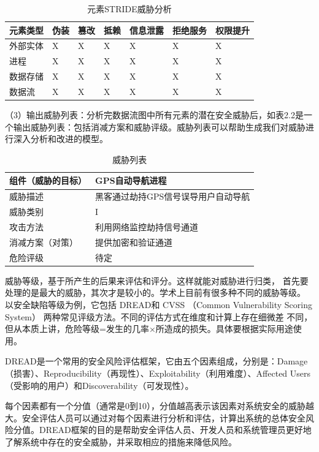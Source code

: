   \begin{table}
    \caption{元素STRIDE威胁分析}
  \begin{center}
    \begin{tabular}{|l|l|l|l|l|l|l}
      \hline 元素类型 & 伪装 & 篡改 & 抵赖 & 信息泄露 & 拒绝服务 & 权限提升\\
      \hline 外部实体 & X & X & X & X & X & X \\
      \hline 进程 & X & X & X & X & X & X \\
      \hline 数据存储 & X & X & X & X & X & X \\
      \hline 数据流 & X & X & X & X & X & X \\
      \hline
      \end{tabular}
  \end{center}
\end{table}
  （3）输出威胁列表：分析完数据流图中所有元素的潜在安全威胁后，如表2.2是一个输出威胁列表：包括消减方案和威胁评级。威胁列表可以帮助生成我们对威胁进行深入分析和改进的模型。
\begin{table}
  \caption{威胁列表}
\begin{center}
  \begin{tabular}{|l|l|}
    \hline 组件（威胁的目标） & GPS自动导航进程 \\
    \hline 威胁描述 & 黑客通过劫持GPS信号误导用户自动导航 \\
    \hline 威胁类别 & I \\
    \hline 攻击方法 & 利用网络监控劫持信号通道 \\
    \hline 消减方案（对策） & 提供加密和验证通道 \\
    \hline 危险评级 & 待定 \\
    \hline
    \end{tabular}
\end{center}
\end{table}
威胁等级，基于所产生的后果来评估和评分。这样就能对威胁进行归类，
首先要处理的是最大的威胁，其次才是较小的。学术上目前有很多种不同的威胁等级。
以安全缺陷等级为例，它包括 DREAD和 CVSS （Common Vulnerability Scoring System）
两种常见评级方法。不同的评估方式在维度和计算上存在细微差
不同，但从本质上讲，危险等级=发生的几率×所造成的损失。具体要根据实际用途使用。

DREAD是一个常用的安全风险评估框架，它由五个因素组成，分别是：Damage（损害）、Reproducibility（再现性）、Exploitability（利用难度）、Affected Users（受影响的用户）和Discoverability（可发现性）。

每个因素都有一个分值（通常是0到10），分值越高表示该因素对系统安全的威胁越大。安全评估人员可以通过对每个因素进行分析和评估，计算出系统的总体安全风险分值。DREAD框架的目的是帮助安全评估人员、开发人员和系统管理员更好地了解系统中存在的安全威胁，并采取相应的措施来降低风险。


